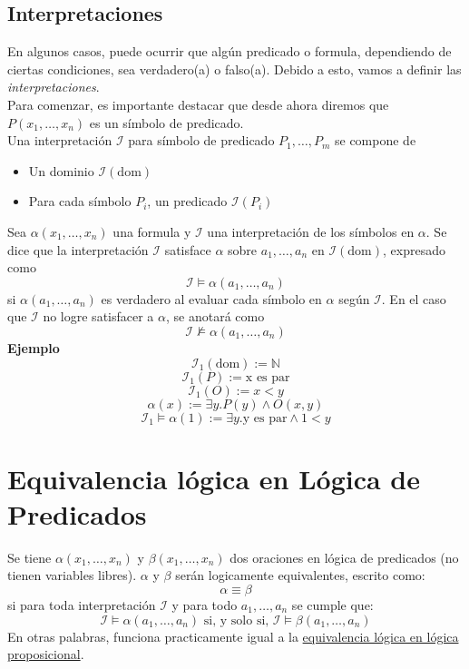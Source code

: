 \documentclass{article}
\begin{document}
\subsection{Interpretaciones}
En algunos casos, puede ocurrir que algún predicado o formula, dependiendo de ciertas condiciones, sea verdadero(a)
o falso(a). Debido a esto, vamos a definir las \textit{interpretaciones}.\\
Para comenzar, es importante destacar que desde ahora diremos que $P(x_{1}, \ldots, x_{n})$ es un símbolo de predicado.\\
Una interpretación $\mathcal{I}$ para símbolo de predicado $P_{1}, \ldots, P_{m}$ se compone de
\begin{itemize}
    \item Un dominio $\mathcal{I}(\text{dom})$
    \item Para cada símbolo $P_{i}$, un predicado $\mathcal{I}(P_{i})$
\end{itemize}
Sea $\alpha{}(x_{1}, \ldots, x_{n})$ una formula y $\mathcal{I}$ una interpretación de los símbolos en $\alpha$. Se dice que la interpretación $\mathcal{I}$ satisface $\alpha$ sobre $a_{1}, \ldots, a_{n}$ en $\mathcal{I}(\text{dom})$, expresado como
$$\mathcal{I} \models \alpha{}(a_{1}, \ldots, a_{n})$$
si $\alpha{}(a_{1}, \ldots, a_{n})$ es verdadero al evaluar cada símbolo en $\alpha$ según $\mathcal{I}$. En el caso que $\mathcal{I}$ no logre satisfacer a $\alpha$, se anotará como
$$\mathcal{I} \not\models \alpha{}(a_{1}, \ldots, a_{n})$$
\textbf{Ejemplo}
$$\mathcal{I}_{1}(\text{dom}) := \mathds{N}$$
$$\mathcal{I}_{1}(P) := \text{x es par}$$
$$\mathcal{I}_{1}(O) := x < y$$
$$\alpha{}(x) := \exists y . P(y) \wedge O(x,y)$$
$$\mathcal{I}_{1} \models \alpha{}(1) := \exists y. \text{y es par} \wedge 1 < y$$

\section{Equivalencia lógica en Lógica de Predicados}
Se tiene $\alpha{}(x_{1}, \ldots, x_{n})$ y $\beta{}(x_{1}, \ldots, x_{n})$ dos oraciones en lógica de predicados (no tienen variables libres). $\alpha$ y $\beta$ serán logicamente equivalentes, escrito como:
$$\alpha \equiv \beta$$
si para toda interpretación $\mathcal{I}$ y para todo $a_{1}, \ldots, a_{n}$ se cumple que:
$$\mathcal{I} \models \alpha{}(a_{1}, \ldots, a_{n}) \text{ si, y solo si, } \mathcal{I} \models \beta{}(a_{1}, \ldots, a_{n})$$
En otras palabras, funciona practicamente igual a la \hyperref[sec:equiv_logica]{equivalencia lógica en lógica 
proposicional}.
\end{document}
